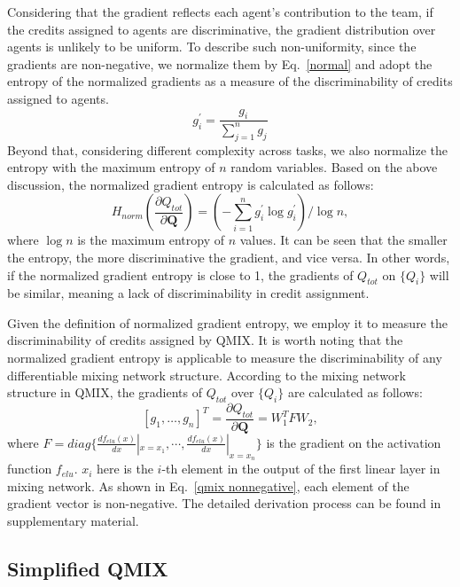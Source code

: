 Considering that the gradient reflects each agent's contribution to the team, if the credits assigned to agents are discriminative, the gradient distribution over agents is unlikely to be uniform. To describe such non-uniformity, since the gradients are non-negative, we normalize them by Eq.~\eqref{normal} and adopt the entropy of the normalized gradients as a measure of the discriminability of credits assigned to agents.
\begin{equation}
    \label{normal}
    g_i^\prime=\frac{g_i}{\sum_{j=1}^n g_j}
\end{equation}
Beyond that, considering different complexity across tasks, we also normalize the entropy with the maximum entropy of $n$ random variables.
Based on the above discussion, the normalized gradient entropy is calculated as follows:
\begin{equation}
    \label{entropy}
    H_{norm}(\frac{\partial Q_{tot}}{\partial \pmb{Q}})=(-\sum_{i=1}^n g_i^\prime \log g_i^\prime)/\log n,
\end{equation}
where $\log n$ is the maximum entropy of $n$ values.
It can be seen that the smaller the entropy, the more discriminative the gradient, and vice versa.
In other words, if the normalized gradient entropy is close to 1, the gradients of $Q_{tot}$ on $\{ Q_i \}$ will be similar, meaning a lack of discriminability in credit assignment.

Given the definition of normalized gradient entropy, we employ it to measure the discriminability of credits assigned by QMIX.
It is worth noting that the normalized gradient entropy is applicable to measure the discriminability of any differentiable mixing network structure.
According to the mixing network structure in QMIX, the gradients of $Q_{tot}$ over $\{Q_i\}$ are calculated as follows:
\begin{equation}
    \label{gradient}
    [g_1,\dots,g_n]^T = \frac{\partial Q_{tot}}{\partial \pmb{Q}}=W_1^T F W_2,
\end{equation}
where $F=diag\{ \frac{df_{elu}(x)}{dx}|_{x=x_1}, \cdots, \frac{df_{elu}(x)}{dx}|_{x=x_n} \}$ is the gradient on the activation function $f_{elu}$. 
$x_i$ here is the $i$-th element in the output of the first linear layer in mixing network. 
As shown in Eq.~\eqref{qmix nonnegative}, each element of the gradient vector is non-negative.
The detailed derivation process can be found in supplementary material.

\subsection{Simplified QMIX}
\label{qsimple}

